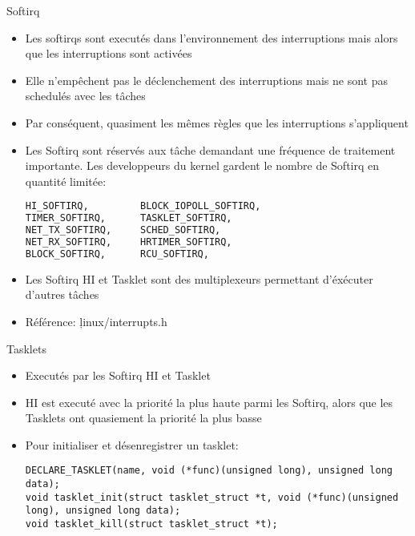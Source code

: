 \begin{frame}[fragile=singleslide]{Softirq}
  \begin{itemize} 
  \item   Les  softirqs   sont  executés   dans   l'environnement  des
    interruptions mais alors que les interruptions sont activées
  \item Elle  n'empêchent pas le déclenchement  des interruptions mais
    ne sont pas schedulés avec les tâches
  \item   Par  conséquent,   quasiment  les   mêmes  règles   que  les
    interruptions s'appliquent
  \item Les Softirq sont réservés aux tâche demandant une fréquence de
    traitement  importante.  Les  developpeurs  du kernel  gardent  le
    nombre de Softirq en quantité limitée:
    \begin{lstlisting}[language=sh]
HI_SOFTIRQ,         BLOCK_IOPOLL_SOFTIRQ,
TIMER_SOFTIRQ,      TASKLET_SOFTIRQ,
NET_TX_SOFTIRQ,     SCHED_SOFTIRQ,
NET_RX_SOFTIRQ,     HRTIMER_SOFTIRQ,
BLOCK_SOFTIRQ,      RCU_SOFTIRQ,
    \end{lstlisting} 
  \item Les Softirq HI et Tasklet sont des multiplexeurs permettant
    d'éxécuter d'autres tâches
  \item Référence: \c{linux/interrupts.h}
  \end{itemize} 
\end{frame}

\begin{frame}[fragile=singleslide]{Tasklets}
  \begin{itemize} 
  \item Executés par les Softirq HI et Tasklet
  \item  HI est  executé  avec la  priorité  la plus  haute parmi  les
    Softirq, alors que les Tasklets ont quasiement la priorité la plus
    basse
  \item Pour initialiser et désenregistrer un tasklet:
    \begin{lstlisting} 
DECLARE_TASKLET(name, void (*func)(unsigned long), unsigned long data);
void tasklet_init(struct tasklet_struct *t, void (*func)(unsigned long), unsigned long data);
void tasklet_kill(struct tasklet_struct *t);
    \end{lstlisting} 
  \end{itemize}
\end{frame}

